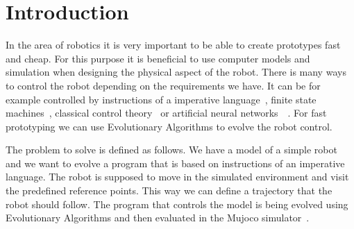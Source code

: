 \documentclass{ExcelAtFIT}
\affiliation{*%
  \href{mailto:xfajku06@stud.fit.vutbr.cz}{xfajku06@stud.fit.vutbr.cz},
  \textit{Faculty of Information Technology, Brno University of Technology}}
\begin{document}
\startdocument



\section{Introduction}
In the area of robotics it is very important to be able to create prototypes fast and cheap.
For this purpose it is beneficial to use computer models and simulation when designing the physical aspect of the robot.
There is many ways to control the robot depending on the requirements we have.
It can be for example controlled by instructions of a imperative language~\cite{Wolff2007}, finite state machines~\cite{Hodgins1996}, classical control theory~\cite{Mita1984} or artificial neural networks~\cite{Reil2002}~\cite{Lewis1996}.
For fast prototyping we can use Evolutionary Algorithms to evolve the robot control.


The problem to solve is defined as follows.
We have a model of a simple robot and we want to evolve a program that is based on instructions of an imperative language.
The robot is supposed to move in the simulated environment and visit the predefined reference points.
This way we can define a trajectory that the robot should follow.
The program that controls the model is being evolved using Evolutionary Algorithms and then evaluated in the Mujoco simulator~\cite{Todorov2012}.
\end{document}
